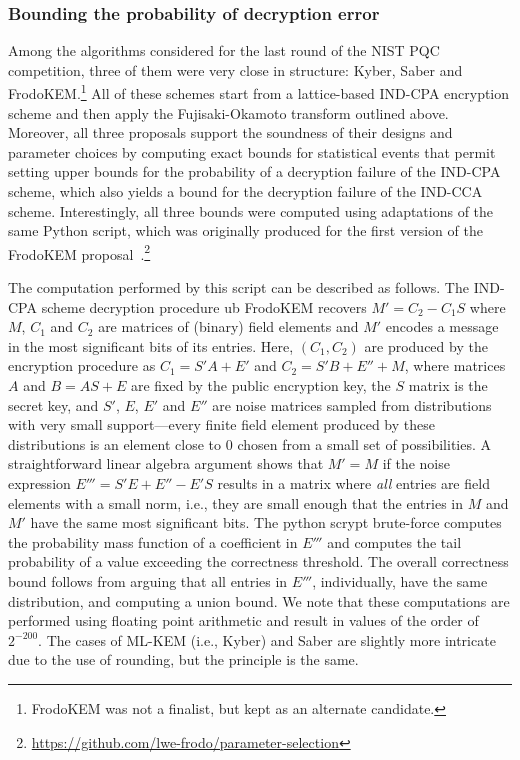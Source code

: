 \subsubsection*{Bounding the probability of decryption error} 
Among the algorithms considered for the last round of the NIST PQC competition, three of them were very close in structure: Kyber, Saber and FrodoKEM.\footnote{FrodoKEM was not a finalist, but kept as an alternate candidate.}
All of these schemes start from a lattice-based IND-CPA encryption scheme and then apply the Fujisaki-Okamoto transform outlined above. Moreover, all three proposals support the soundness of their designs and parameter choices by computing exact bounds for statistical events that permit setting upper bounds for the probability of a decryption failure of the IND-CPA scheme, which also yields a bound for the decryption failure of the IND-CCA scheme.
Interestingly, all three bounds were computed using adaptations of the same Python script, which was originally produced for the first version of the FrodoKEM proposal~\cite{CCS:BCDMNN16}.\footnote{\url{https://github.com/lwe-frodo/parameter-selection}}

The computation performed by this script can be described as follows.
The IND-CPA scheme decryption procedure ub FrodoKEM recovers $M' = C_2 - C_1S$ where $M$, $C_1$ and $C_2$ are matrices of (binary) field elements and $M'$ encodes a message in the most significant bits of its entries. Here, $(C_1,C_2)$ are produced by the encryption procedure as $C_1 = S'A+E'$ and $C_2 = S'B+E'' + M$, where matrices $A$ and $B=AS+E$ are fixed by the public encryption key, the $S$ matrix is the secret key, and $S'$, $E$, $E'$ and $E''$ are noise matrices sampled from distributions with very small support---every finite field element produced by these distributions is an element close to $0$ chosen from a small set of possibilities. A straightforward linear algebra argument shows that $M'=M$ if the noise expression $E'''=S'E+E''-E'S$ results in a matrix where {\em all} entries are field elements with a small norm, i.e., they are small enough that the entries in $M$ and $M'$ have the same most significant bits.
The python scrypt brute-force computes the probability mass function of a coefficient in $E'''$ and computes the tail probability of a value exceeding the correctness threshold. The overall correctness bound follows from arguing that all entries in $E'''$, individually, have the same distribution, and computing a union bound. We note that these computations are performed using floating point arithmetic and result in values of the order of $2^{-200}$. 
The cases of ML-KEM (i.e., Kyber) and Saber are slightly more intricate due to the use of rounding, but the principle is the same.

